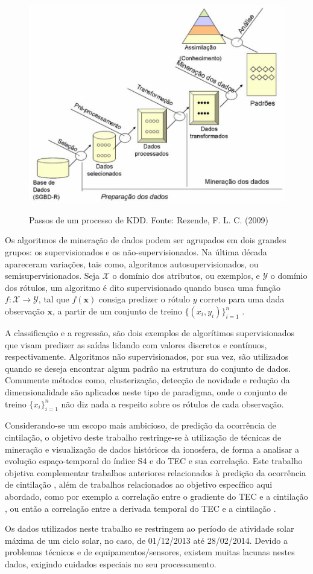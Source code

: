 \begin{figure}[H]
\centering
\includegraphics[width=0.8\columnwidth]{./Figuras/kdd.png}
\label{fig:kdd}
\caption{Passos de um processo de KDD. Fonte: Rezende, F. L. C. (2009)}
\end{figure}

Os algoritmos de mineração de dados podem ser agrupados em dois grandes grupos: os supervisionados e os não-supervisionados. Na última década apareceram variações, tais como, algoritmos autosupervisionados, ou semisupervisionados. Seja $\mathcal{X}$ o domínio dos atributos, ou exemplos, e $\mathcal{Y}$ o domínio dos rótulos, um algoritmo é dito supervisionado quando busca uma função $f : \mathcal{X} \to \mathcal{Y}$, tal que $f(\textbf{x})$ consiga predizer o rótulo $y$ correto para uma dada observação $\textbf{x}$, a partir de um conjunto de treino $\{(x_i, y_i)\}_{i=1}^n$ \cite{ZHU:2009}.

A classificação e a regressão, são dois exemplos de algorítimos supervisionados que visam predizer as saídas lidando com valores discretos e contínuos, respectivamente. Algoritmos não supervisionados, por sua vez, são utilizados quando se deseja encontrar algum padrão na estrutura do conjunto de dados. Comumente métodos como, clusterização, detecção de novidade e redução da dimensionalidade são aplicados neste tipo de paradigma, onde o conjunto de treino $\{x_i\}_{i=1}^n$ não diz nada a respeito sobre os rótulos de cada observação.

Considerando-se um escopo mais ambicioso, de predição da ocorrência de cintilação, o objetivo deste trabalho restringe-se à utilização de técnicas de mineração e visualização de dados históricos da ionosfera, de forma a analisar a evolução espaço-temporal do índice S4 e do TEC e sua correlação. Este trabalho objetiva complementar trabalhos anteriores relacionados à predição da ocorrência de cintilação \cite{REZENDE:2009, GLAUSTON:2014, GLAUSTON:2015}, além de trabalhos relacionados ao objetivo específico aqui abordado, como por exemplo a correlação entre o gradiente do TEC e a cintilação \cite{RAGHAVARAO:1998, RAY:2006}, ou então a correlação entre a derivada temporal do TEC e a cintilação \cite{RAGHUNATH:2016}.

Os dados utilizados neste trabalho se restringem ao período de atividade solar máxima de um ciclo solar, no caso, de 01/12/2013 até 28/02/2014. Devido a problemas técnicos e de equipamentos/sensores, existem muitas lacunas nestes dados, exigindo cuidados especiais no seu processamento.

